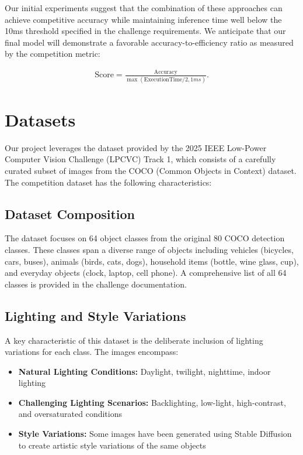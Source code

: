 \documentclass[11pt, oneside]{article}   	%
\begin{document}
Our initial experiments suggest that the combination of these approaches can achieve competitive accuracy while maintaining inference time well below the 10ms threshold specified in the challenge requirements. We anticipate that our final model will demonstrate a favorable accuracy-to-efficiency ratio as measured by the competition metric:

\begin{align*}
	\text{Score} = \frac{\text{Accuracy}}{\max(\text{ExecutionTime}/2, 1ms)}.
\end{align*}


\section*{Datasets}

Our project leverages the dataset provided by the 2025 IEEE Low-Power Computer Vision Challenge (LPCVC) Track 1, which consists of a carefully curated subset of images from the COCO (Common Objects in Context) dataset. The competition dataset has the following characteristics:

\subsection*{Dataset Composition}

The dataset focuses on 64 object classes from the original 80 COCO detection classes. These classes span a diverse range of objects including vehicles (bicycles, cars, buses), animals (birds, cats, dogs), household items (bottle, wine glass, cup), and everyday objects (clock, laptop, cell phone). A comprehensive list of all 64 classes is provided in the challenge documentation.

\subsection*{Lighting and Style Variations}

A key characteristic of this dataset is the deliberate inclusion of lighting variations for each class. The images encompass:

\begin{itemize}
	\item \textbf{Natural Lighting Conditions:} Daylight, twilight, nighttime, indoor lighting
	\item \textbf{Challenging Lighting Scenarios:} Backlighting, low-light, high-contrast, and oversaturated conditions
	\item \textbf{Style Variations:} Some images have been generated using Stable Diffusion to create artistic style variations of the same objects
\end{itemize}
\end{document}
